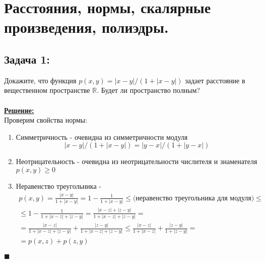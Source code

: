 \documentclass[a4paper,12pt,titlepage,final]{article}
\begin{document}
\newpage
\section*{Расстояния, нормы, скалярные произведения, полиэдры.}
\subsection*{Задача 1:}
\noindent Докажите, что функция $p(x, y) = |x - y|/(1 + |x - y|)$ задает расстояние в вещественном пространстве $\mathbb{R}$. Будет ли пространство полным? \\ \\
\textbf{\underline{Решение:}} \\
Проверим свойства нормы:
\begin{enumerate}
    \item Симметричность - очевидна из симметричности модуля
    $$|x - y|/(1 + |x - y|) = |y - x|/(1 + |y - x|)$$
    \item Неотрицательность - очевидна из неотрицательности числителя и знаменателя $p(x, y) \ge 0$
    \item Неравенство треугольника -
    \begin{gather*}
        p(x, y) = \frac{|x - y|}{1 + |x - y|} = 1 - \frac{1}{1 + |x - y|} \le \text{(неравенство треугольника для модуля)} \le \\
        \le 1 - \frac{1}{1 + |x - z| + |z - y|} = \frac{|x - z| + |z - y|}{1 + |x - z| + |z - y|} = \\
        = \frac{|x - z|}{1 + |x - z| + |z - y|} + \frac{|z - y|}{1 + |x - z| + |z - y|} \le \frac{|x - z|}{1 + |x - z|} + \frac{|z - y|}{1 + |z - y|} = \\
        = p(x, z) + p(z, y)
    \end{gather*}
\end{enumerate}
$\blacksquare$ \\ \\ \\
\end{document}

